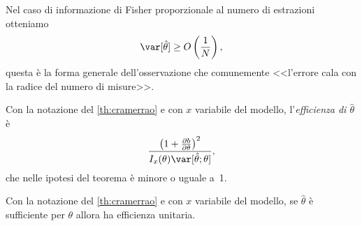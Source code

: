 Nel caso di informazione di Fisher proporzionale al numero di estrazioni otteniamo
\begin{equation*}
	\var[\hat\theta] \ge O \left(\frac1N\right),
\end{equation*}
questa è la forma generale dell'osservazione che comunemente
<<l'errore cala con la radice del numero di misure>>.

\begin{definition}[Efficienza]
	Con la notazione del \autoref{th:cramerrao} e con $x$ variabile del modello,
	l'\emph{efficienza di $\hat\theta$} è
	\begin{equation*}
		\frac{\left( 1 + \frac{\partial b}{\partial\theta} \right)^2}{I_x(\theta)\var[\hat\theta;\theta]},
	\end{equation*}
	che nelle ipotesi del teorema è minore o uguale a~1.
\end{definition}

\begin{theorem}
	\label{th:suffeff}
	Con la notazione del \autoref{th:cramerrao} e con $x$ variabile del modello,
	se $\hat\theta$ è sufficiente per $\theta$ allora ha efficienza unitaria.
\end{theorem}

